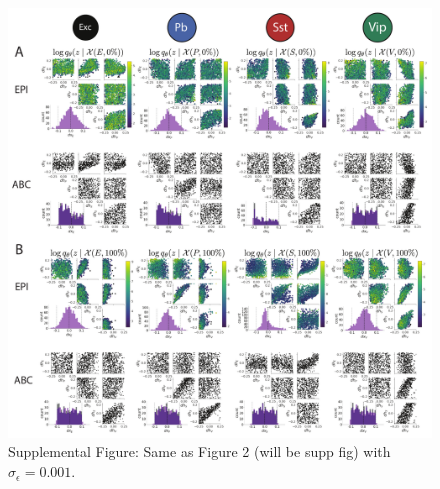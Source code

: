 \documentclass[11pt]{article}
\begin{document}
\begin{figure}[h]
\caption{\small Supplemental Figure: Same as Figure 2 (will be supp fig) with $\sigma_{\epsilon} = 0.001$.
 }\label{fig:SX2}
\begin{center}
\includegraphics[scale=.5]{figs/FigSX/Fig_SX2.pdf}
\end{center}
\end{figure}




\end{document}
